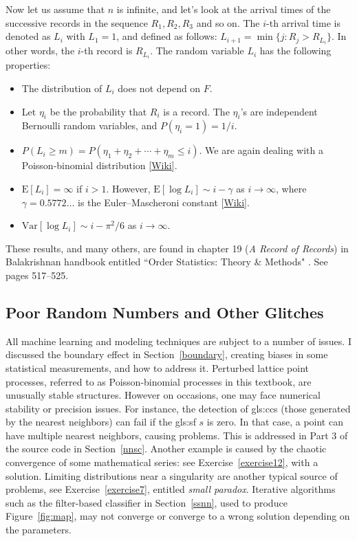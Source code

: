\documentclass[10pt]{article}
\begin{document}
\noindent Now let us assume that $n$ is infinite, and let's look at the arrival times of the successive records in the sequence $R_1,R_2,R_3$ and so on. The $i$-th arrival time is denoted as $L_i$
with $L_1=1$,
and defined   as follows: $L_{i+1}=\min\{j : R_j > R_{L_i}\}$. In other words, the $i$-th record is $R_{L_i}$. The random variable $L_i$ has the following properties:
\begin{itemize}
\item The distribution of $L_i$ does not depend on $F$.
\item Let $\eta_i$ be the probability that $R_i$ is a record. The $\eta_i$'s are independent Bernoulli random variables, and  $P(\eta_i=1)=1/i$.
\item $P(L_i\geq m) = P(\eta_1+\eta_2+\cdots+\eta_m\leq i)$. We are again dealing with a \textcolor{index}{Poisson-binomial distribution}
 [\href{https://en.wikipedia.org/wiki/Poisson_binomial_distribution}{Wiki}].
\item $\mbox{E}[L_i]=\infty$ if $i>1$. However, $\mbox{E}[\log L_i]\sim i-\gamma$ as $i\rightarrow \infty$, where $\gamma=0.5772\dots$ is
the Euler–Mascheroni constant [\href{https://bit.ly/35eVQQl}{Wiki}].
\item $\mbox{Var}[\log L_i]\sim i - \pi^2/6$ as $i\rightarrow\infty$.
\end{itemize}
These results, and many others, are found in chapter 19 ({\em A Record of Records}) in Balakrishnan handbook entitled ``Order Statistics: Theory \& Methods" \cite{order2}.
See pages 517--525.



\subsection{Poor Random Numbers and Other Glitches}\label{flaws}


All machine learning and modeling techniques are subject to a number of issues. I discussed the boundary effect in Section~\ref{boundary}, creating biases in some statistical
measurements, and how to address it. Perturbed lattice point processes, referred to as Poisson-binomial processes in this textbook, are unusually stable structures. However on occasions, one may face \textcolor{index}{numerical stability} or precision issues. For instance, the detection of
\glspl{gls:cc} (those generated by the \textcolor{index}{nearest neighbors}) can fail if the
\gls{gls:sf} $s$ is zero. In that case, a point can have multiple nearest neighbors, causing problems. This is addressed in Part 3 of the source code in Section~\ref{nnsc}. Another example is  caused by the chaotic convergence of some mathematical series: see Exercise~\ref{exercise12}, with a solution. Limiting distributions near a singularity are another typical source of problems, see Exercise~\ref{exercise7}, entitled {\em small
 paradox}. Iterative algorithms such as the filter-based classifier in Section~\ref{ssnn}, used to produce
Figure~\ref{fig:map}, may not converge or converge to a wrong solution depending on the parameters.
\end{document}
